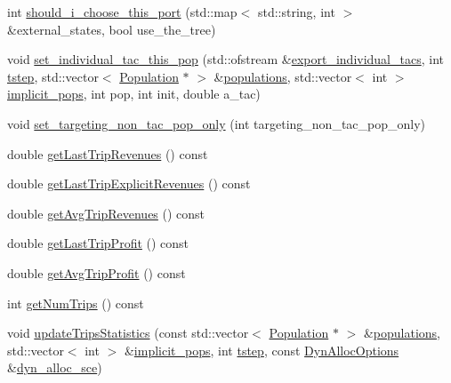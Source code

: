 \begin{DoxyCompactItemize}
\item 
int \mbox{\hyperlink{class_vessel_aae6fae8e1dd56f25bcdb4711d08b2e9b}{should\+\_\+i\+\_\+choose\+\_\+this\+\_\+port}} (std\+::map$<$ std\+::string, int $>$ \&external\+\_\+states, bool use\+\_\+the\+\_\+tree)
\item 
void \mbox{\hyperlink{class_vessel_a8f7bd71aa4502532e5537ba338140566}{set\+\_\+individual\+\_\+tac\+\_\+this\+\_\+pop}} (std\+::ofstream \&\mbox{\hyperlink{thread__vessels_8cpp_a0ce9054b3d0c5f983ad61d3ed27346f7}{export\+\_\+individual\+\_\+tacs}}, int \mbox{\hyperlink{thread__vessels_8cpp_a84bc73d278de929ec9974e1a95d9b23a}{tstep}}, std\+::vector$<$ \mbox{\hyperlink{class_population}{Population}} $\ast$ $>$ \&\mbox{\hyperlink{thread__vessels_8cpp_a52b340841e812112c424c384bb9e7ebc}{populations}}, std\+::vector$<$ int $>$ \mbox{\hyperlink{thread__vessels_8cpp_a249b6522d595e6a057580471ab5a4517}{implicit\+\_\+pops}}, int pop, int init, double a\+\_\+tac)
\item 
void \mbox{\hyperlink{class_vessel_a4365d7673cb95a798fa713f427af2aa4}{set\+\_\+targeting\+\_\+non\+\_\+tac\+\_\+pop\+\_\+only}} (int targeting\+\_\+non\+\_\+tac\+\_\+pop\+\_\+only)
\item 
double \mbox{\hyperlink{class_vessel_a5e765f0efb893b5ef439d26385e85b9e}{get\+Last\+Trip\+Revenues}} () const
\item 
double \mbox{\hyperlink{class_vessel_ae2bd9dd2d960e53b3bba71f93d192cd7}{get\+Last\+Trip\+Explicit\+Revenues}} () const
\item 
double \mbox{\hyperlink{class_vessel_a84a7bd0dbb926a74871d536a3a81cc1a}{get\+Avg\+Trip\+Revenues}} () const
\item 
double \mbox{\hyperlink{class_vessel_ac04155d7c6d8145b7345c46c8f565991}{get\+Last\+Trip\+Profit}} () const
\item 
double \mbox{\hyperlink{class_vessel_aca27d89d8d969b775f919d29109c53a8}{get\+Avg\+Trip\+Profit}} () const
\item 
int \mbox{\hyperlink{class_vessel_a86748cee593895d5188f47518f89e65d}{get\+Num\+Trips}} () const
\item 
void \mbox{\hyperlink{class_vessel_a4e0a8d6463960d20a33c2ac4ae435609}{update\+Trips\+Statistics}} (const std\+::vector$<$ \mbox{\hyperlink{class_population}{Population}} $\ast$ $>$ \&\mbox{\hyperlink{thread__vessels_8cpp_a52b340841e812112c424c384bb9e7ebc}{populations}}, std\+::vector$<$ int $>$ \&\mbox{\hyperlink{thread__vessels_8cpp_a249b6522d595e6a057580471ab5a4517}{implicit\+\_\+pops}}, int \mbox{\hyperlink{thread__vessels_8cpp_a84bc73d278de929ec9974e1a95d9b23a}{tstep}}, const \mbox{\hyperlink{class_dyn_alloc_options}{Dyn\+Alloc\+Options}} \&\mbox{\hyperlink{thread__vessels_8cpp_a8389f6b9261a2039cabeecc230207043}{dyn\+\_\+alloc\+\_\+sce}})

\end{DoxyCompactItemize}
